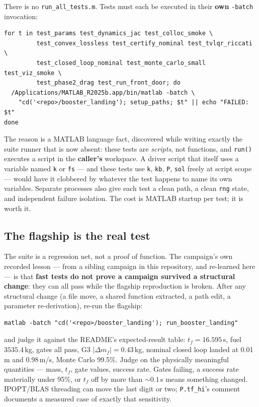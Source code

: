\documentclass[11pt]{article}
\begin{document}
There is no \texttt{run\_all\_tests.m}. Tests must each be executed in their
\textbf{own} \texttt{-batch} invocation:

\begin{verbatim}
for t in test_params test_dynamics_jac test_colloc_smoke \
         test_convex_lossless test_certify_nominal test_tvlqr_riccati \
         test_closed_loop_nominal test_monte_carlo_small test_viz_smoke \
         test_phase2_drag test_run_front_door; do
  /Applications/MATLAB_R2025b.app/bin/matlab -batch \
    "cd('<repo>/booster_landing'); setup_paths; $t" || echo "FAILED: $t"
done
\end{verbatim}

The reason is a MATLAB language fact, discovered while writing exactly the
suite runner that is now absent: these tests are \emph{scripts}, not
functions, and \texttt{run()} executes a script in the \textbf{caller's}
workspace. A driver script that itself uses a variable named \texttt{k} or
\texttt{fs} --- and these tests use \texttt{k}, \texttt{kb}, \texttt{P},
\texttt{sol} freely at script scope --- would have it clobbered by whatever
the test happens to name its own variables. Separate processes also give
each test a clean path, a clean \texttt{rng} state, and independent failure
isolation. The cost is MATLAB startup per test; it is worth it.

\subsection{The flagship is the real test}
\label{sec:tests:flagship}

The suite is a regression net, not a proof of function. The campaign's own
recorded lesson --- from a sibling campaign in this repository, and
re-learned here --- is that \textbf{fast tests do not prove a campaign
survived a structural change}: they can all pass while the flagship
reproduction is broken. After any structural change (a file move, a shared
function extracted, a path edit, a parameter re-derivation), re-run the
flagship:

\begin{verbatim}
matlab -batch "cd('<repo>/booster_landing'); run_booster_landing"
\end{verbatim}

and judge it against the README's expected-result table: $t_f = 16.595$\,s,
fuel $3535.4$\,kg, gates all pass, G3 $|\Delta m_f| = 0.43$\,kg, nominal
closed loop landed at 0.01\,m and 0.98\,m/s, Monte Carlo 99.5\%. Judge on
the physically meaningful quantities --- mass, $t_f$, gate values, success
rate. Gates failing, a success rate materially under 95\%, or $t_f$ off by
more than $\sim0.1$\,s means something changed. IPOPT/BLAS threading can
move the last digit or two; \texttt{P.tf\_hi}'s comment documents a measured
case of exactly that sensitivity.
\end{document}
